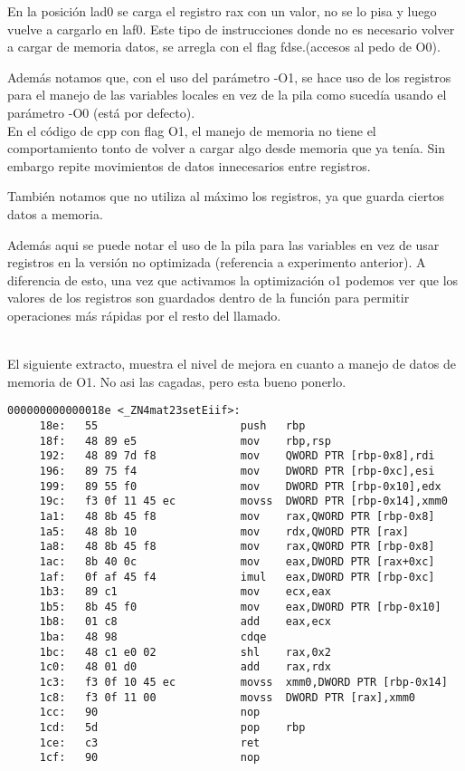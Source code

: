 En la posición lad0 se carga el registro rax con un valor, no se lo pisa y luego vuelve a cargarlo en laf0. Este tipo de instrucciones donde no es necesario volver a cargar de memoria datos, se arregla con el flag fdse.(accesos al pedo de O0).

Además notamos que, con el uso del parámetro -O1, se hace uso de los registros para el manejo de las variables locales en vez de la pila como sucedía usando el parámetro -O0 (está por defecto).\\

En el código de cpp con flag O1, el manejo de memoria no tiene el comportamiento tonto de volver a cargar algo desde memoria que ya tenía. Sin embargo repite movimientos de datos innecesarios entre registros.

También notamos que no utiliza al máximo los registros, ya que guarda ciertos datos a memoria.


Además aqui se puede notar el uso de la pila para las variables en vez de usar registros en la versión no optimizada (referencia a experimento anterior). A diferencia de esto, una vez que activamos la optimización o1 podemos ver que los valores de los registros son guardados dentro de la función para permitir operaciones más rápidas por el resto del llamado.


~\\


El siguiente extracto, muestra el nivel de mejora en cuanto a manejo de datos de memoria de O1. No asi las cagadas, pero esta bueno ponerlo.

\begin{verbatim}
000000000000018e <_ZN4mat23setEiif>:
     18e:	55                   	push   rbp
     18f:	48 89 e5             	mov    rbp,rsp
     192:	48 89 7d f8          	mov    QWORD PTR [rbp-0x8],rdi
     196:	89 75 f4             	mov    DWORD PTR [rbp-0xc],esi
     199:	89 55 f0             	mov    DWORD PTR [rbp-0x10],edx
     19c:	f3 0f 11 45 ec       	movss  DWORD PTR [rbp-0x14],xmm0
     1a1:	48 8b 45 f8          	mov    rax,QWORD PTR [rbp-0x8]
     1a5:	48 8b 10             	mov    rdx,QWORD PTR [rax]
     1a8:	48 8b 45 f8          	mov    rax,QWORD PTR [rbp-0x8]
     1ac:	8b 40 0c             	mov    eax,DWORD PTR [rax+0xc]
     1af:	0f af 45 f4          	imul   eax,DWORD PTR [rbp-0xc]
     1b3:	89 c1                	mov    ecx,eax
     1b5:	8b 45 f0             	mov    eax,DWORD PTR [rbp-0x10]
     1b8:	01 c8                	add    eax,ecx
     1ba:	48 98                	cdqe   
     1bc:	48 c1 e0 02          	shl    rax,0x2
     1c0:	48 01 d0             	add    rax,rdx
     1c3:	f3 0f 10 45 ec       	movss  xmm0,DWORD PTR [rbp-0x14]
     1c8:	f3 0f 11 00          	movss  DWORD PTR [rax],xmm0
     1cc:	90                   	nop
     1cd:	5d                   	pop    rbp
     1ce:	c3                   	ret    
     1cf:	90                   	nop
\end{verbatim}


